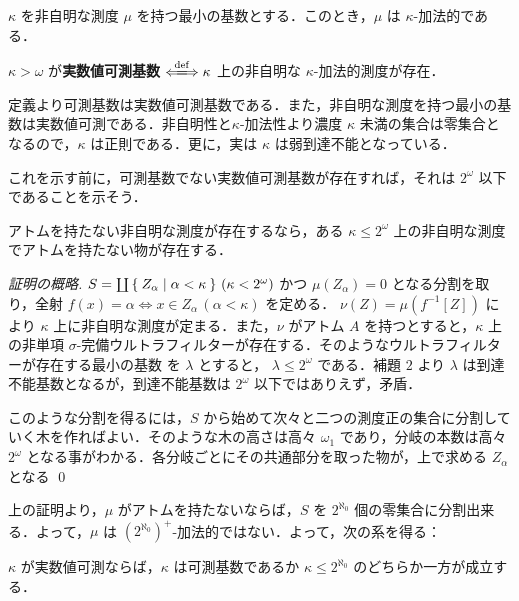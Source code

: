 \documentclass[a4j]{jsarticle}
\begin{document}
\begin{corollary}\label{cor:least-nontrivial-additivity}
 $\kappa$ を非自明な測度 $\mu$ を持つ最小の基数とする．このとき，$\mu$ は $\kappa$-加法的である．
\end{corollary}

\begin{definition}
 $\kappa > \omega$ が{\bfseries 実数値可測基数} $\defs \kappa$ 上の非自明な $\kappa$-加法的測度が存在．
\end{definition}

定義より可測基数は実数値可測基数である．また，非自明な測度を持つ最小の基数は実数値可測である．非自明性と$\kappa$-加法性より濃度 $\kappa$ 未満の集合は零集合となるので，$\kappa$ は正則である．更に，実は $\kappa$ は弱到達不能となっている．

これを示す前に，可測基数でない実数値可測基数が存在すれば，それは $2^\omega$ 以下であることを示そう．

\begin{lemma}
 \label{Lem:atomless-nontrivial}
 アトムを持たない非自明な測度が存在するなら，ある $\kappa \leq 2^\omega$ 上の非自明な測度でアトムを持たない物が存在する．
\end{lemma}
\begin{proof}[証明の概略]
 $S = \coprod \Set{ Z_\alpha | \alpha < \kappa} \, (\kappa < 2^\omega)$ かつ $\mu(Z_\alpha) = 0$ となる分割を取り，全射 $f(x) = \alpha \Leftrightarrow x \in Z_\alpha \, (\alpha < \kappa)$ を定める． $\nu(Z) = \mu(f^{-1}[Z])$ により $\kappa$ 上に非自明な測度が定まる．また，$\nu$ がアトム $A$ を持つとすると，$\kappa$ 上の非単項 $\sigma$-完備ウルトラフィルターが存在する．そのようなウルトラフィルターが存在する最小の基数 を $\lambda$ とすると， $\lambda \leq 2^\omega$ である．補題 $2$ より $\lambda$ は到達不能基数となるが，到達不能基数は $2^\omega$ 以下ではありえず，矛盾．

 このような分割を得るには，$S$ から始めて次々と二つの測度正の集合に分割していく木を作ればよい．そのような木の高さは高々 $\omega_1$ であり，分岐の本数は高々 $2^\omega$ となる事がわかる．各分岐ごとにその共通部分を取った物が，上で求める $Z_\alpha$ となる \qed
\end{proof}

上の証明より，$\mu$ がアトムを持たないならば，$S$ を $2^{\aleph_0}$ 個の零集合に分割出来る．よって，$\mu$ は $(2^{\aleph_0})^+$-加法的ではない．よって，次の系を得る：

\begin{corollary}
 $\kappa$ が実数値可測ならば，$\kappa$ は可測基数であるか $\kappa \leq 2^{\aleph_0}$ のどちらか一方が成立する．
\end{corollary}
\end{document}
